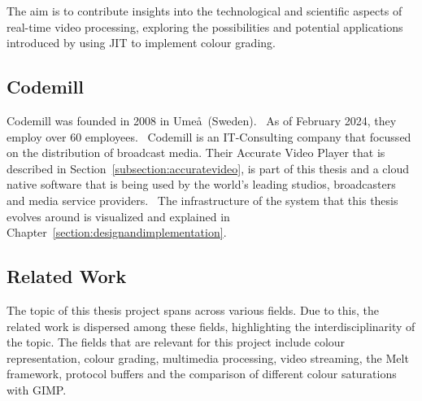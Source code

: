 \documentclass[../MasterThesis.tex]{subfiles}
\begin{document}
	
	The aim is to contribute insights into the technological and scientific aspects of real-time video processing, exploring the possibilities and potential applications introduced by using JIT to implement colour grading. 
	
	
	
	
	
	
	
	\subsection{Codemill} \label{subsection:codemill}
	
	Codemill was founded in 2008 in Ume\aa \ (Sweden).~\cite{codemill_now, codemill_old, codemill_linkedin}
	As of February 2024, they employ over 60 employees.~\cite{codemill} 
	Codemill is an IT-Consulting company that focussed on the distribution of broadcast media. Their Accurate Video Player that is described in Section~\ref{subsection:accuratevideo}, is part of this thesis and a cloud native software that is being used by the world's leading studios, broadcasters and media service providers.~\cite{codemill_linkedin, codemill_avp}
	The infrastructure of the system that this thesis evolves around is visualized and explained in Chapter~\ref{section:designandimplementation}.
	
	
	
	
	
	
	
	
	
	
	
	
	\subsection{Related Work} \label{subsection:relatedwork}
	
	The topic of this thesis project spans across various fields. 
	Due to this, the related work is dispersed among these fields, highlighting the interdisciplinarity of the topic.
	The fields that are relevant for this project include colour representation, colour grading, multimedia processing, video streaming, the Melt framework, protocol buffers and the comparison of different colour saturations with GIMP.
\end{document}
